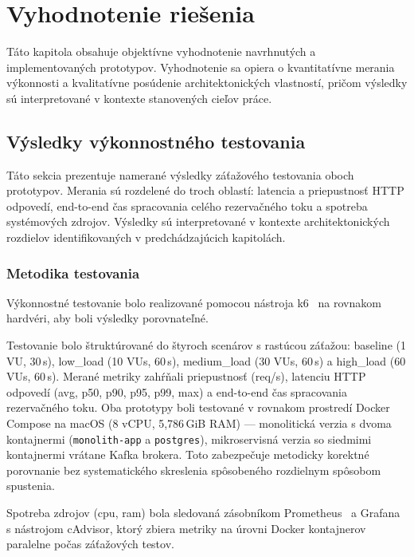 \chapter{Vyhodnotenie riešenia}\label{ch:evaluation}

Táto kapitola obsahuje objektívne vyhodnotenie navrhnutých a implementovaných prototypov. Vyhodnotenie sa opiera o kvantitatívne merania výkonnosti a kvalitatívne posúdenie architektonických vlastností, pričom výsledky sú interpretované v kontexte stanovených cieľov práce.

\section{Výsledky výkonnostného testovania}\label{sec:load-testing}

Táto sekcia prezentuje namerané výsledky záťažového testovania oboch prototypov. Merania sú rozdelené do troch oblastí: latencia a priepustnosť HTTP odpovedí, end-to-end čas spracovania celého rezervačného toku a spotreba systémových zdrojov. Výsledky sú interpretované v kontexte architektonických rozdielov identifikovaných v predchádzajúcich kapitolách.

\subsection{Metodika testovania}

Výkonnostné testovanie bolo realizované pomocou nástroja k6~\cite{k6Docs2025} na rovnakom hardvéri, aby boli výsledky porovnateľné.

Testovanie bolo štruktúrované do štyroch scenárov s rastúcou záťažou: baseline (1 VU, 30\,s), low\_load (10 VUs, 60\,s), medium\_load (30 VUs, 60\,s) a high\_load (60 VUs, 60\,s). Merané metriky zahŕňali priepustnosť (req/s), latenciu HTTP odpovedí (avg, p50, p90, p95, p99, max) a end-to-end čas spracovania rezervačného toku. Oba prototypy boli testované v rovnakom prostredí Docker Compose na macOS (8 vCPU, 5,786\,GiB RAM) — monolitická verzia s dvoma kontajnermi (\texttt{monolith-app} a \texttt{postgres}), mikroservisná verzia so siedmimi kontajnermi vrátane Kafka brokera. Toto zabezpečuje metodicky korektné porovnanie bez systematického skreslenia spôsobeného rozdielnym spôsobom spustenia.

Spotreba zdrojov (\acrshort{cpu}, \acrshort{ram}) bola sledovaná zásobníkom Prometheus~\cite{PrometheusDocs2025} a Grafana~\cite{GrafanaDocs2025} s nástrojom cAdvisor, ktorý zbiera metriky na úrovni Docker kontajnerov paralelne počas záťažových testov.

